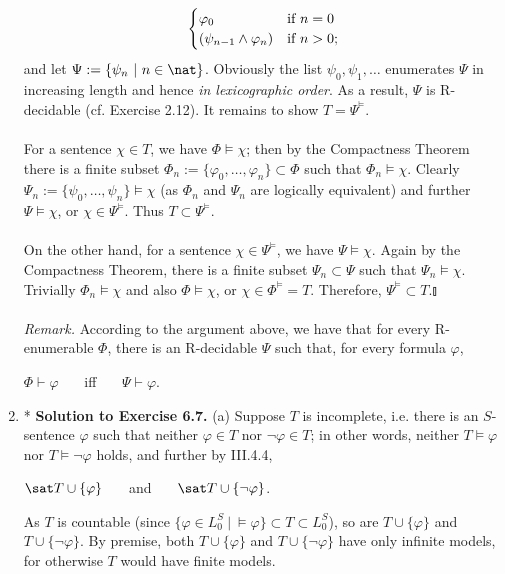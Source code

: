 \begin{enumerate}[1.]
\[\begin{cases}
\varphi_0                      & \mbox{if \(n = 0\)} \cr
(\psi_{n - 1} \land \varphi_n) & \mbox{if \(n > 0\)};
\end{cases}
\]
and let $\Psi := \{ \psi_n \ | \ n \in \nat \}$. Obviously the list $\psi_0, \psi_1, \ldots$ enumerates $\Psi$ in increasing length and hence \emph{in lexicographic order}. As a result, $\Psi$ is R-decidable (cf. Exercise 2.12). It remains to show $T = \Psi^{\models}$.\\
\ \\
For a sentence $\chi \in T$, we have $\Phi \models \chi$; then by the Compactness Theorem there is a finite subset $\Phi_n := \{ \varphi_0, \ldots, \varphi_n \} \subset \Phi$ such that $\Phi_n \models \chi$. Clearly $\Psi_n := \{ \psi_0, \ldots, \psi_n \} \models \chi$ (as $\Phi_n$ and $\Psi_n$ are logically equivalent) and further $\Psi \models \chi$, or $\chi \in \Psi^{\models}$. Thus $T \subset \Psi^{\models}$.\\
\ \\
On the other hand, for a sentence $\chi \in \Psi^{\models}$, we have $\Psi \models \chi$. Again by the Compactness Theorem, there is a finite subset $\Psi_n \subset \Psi$ such that $\Psi_n \models \chi$. Trivially $\Phi_n \models \chi$ and also $\Phi \models \chi$, or $\chi \in \Phi^{\models} = T$. Therefore, $\Psi^{\models} \subset T$.\nolinebreak\hfill$\talloblong$\\
\ \\
\textit{Remark.} According to the argument above, we have that for every R-enumerable $\Phi$, there is an R-decidable $\Psi$ such that, for every formula $\varphi$,
\begin{center}
$\Phi \vdash \varphi$ \ \ \ iff \ \ \ $\Psi \vdash \varphi$.
\end{center}
%
\item* \textbf{Solution to Exercise 6.7.} (a) Suppose $T$ is incomplete, i.e. there is an $S$-sentence $\varphi$ such that neither $\varphi \in T$ nor $\neg\varphi \in T$; in other words, neither $T \models \varphi$ nor $T \models \neg\varphi$ holds, and further by III.4.4,
\begin{center}
$\sat T \cup \{ \varphi \}$ \ \ \ and \ \ \ $\sat T \cup \{ \neg\varphi \}$.
\end{center}
As $T$ is countable (since $\{ \varphi \in L^S_0 \ | \ \models \varphi \} \subset T \subset L^S_0$), so are $T \cup \{ \varphi \}$ and $T \cup \{ \neg\varphi \}$. By premise, both $T \cup \{ \varphi \}$ and $T \cup \{ \neg\varphi \}$ have only infinite models, for otherwise $T$ would have finite models.\\

\end{enumerate}
